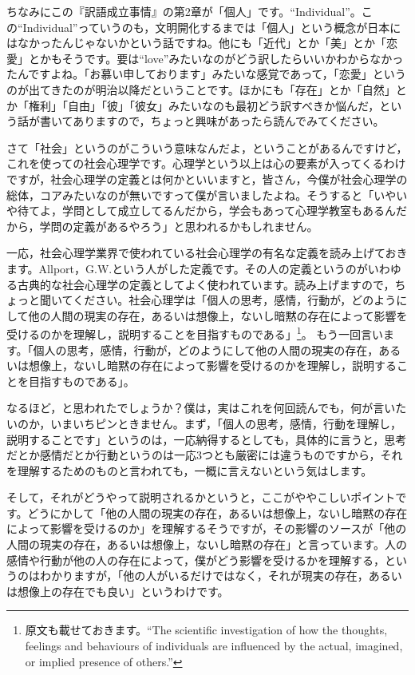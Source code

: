 \documentclass{ltjsbook}
\begin{document}
ちなみにこの『訳語成立事情』の第2章が「個人」です。``Individual''。この``Individual''っていうのも，文明開化するまでは「個人」という概念が日本にはなかったんじゃないかという話ですね。他にも「近代」とか「美」とか「恋愛」とかもそうです。要は``love''みたいなのがどう訳したらいいかわからなかったんですよね。「お慕い申しております」みたいな感覚であって，「恋愛」というのが出てきたのが明治以降だということです。ほかにも「存在」とか「自然」とか「権利」「自由」「彼」「彼女」みたいなのも最初どう訳すべきか悩んだ，という話が書いてありますので，ちょっと興味があったら読んでみてください。

さて「社会」というのがこういう意味なんだよ，ということがあるんですけど，これを使っての社会心理学です。心理学という以上は心の要素が入ってくるわけですが，社会心理学の定義とは何かといいますと，皆さん，今僕が社会心理学の総体，コアみたいなのが無いですって僕が言いましたよね。そうすると「いやいや待てよ，学問として成立してるんだから，学会もあって心理学教室もあるんだから，学問の定義があるやろう」と思われるかもしれません。

一応，社会心理学業界で使われている社会心理学の有名な定義を読み上げておきます。Allport，G.W.という人がした定義\parencite{Allport1954}です。その人の定義というのがいわゆる古典的な社会心理学の定義としてよく使われています。読み上げますので，ちょっと聞いてください。社会心理学は「個人の思考，感情，行動が，どのようにして他の人間の現実の存在，あるいは想像上，ないし暗黙の存在によって影響を受けるのかを理解し，説明することを目指すものである」\footnote{原文も載せておきます。``The scientific investigation of how the thoughts, feelings and behaviours of individuals are influenced by the actual, imagined, or implied presence of others.''\parencite{Allport1954}}。
もう一回言います。「個人の思考，感情，行動が，どのようにして他の人間の現実の存在，あるいは想像上，ないし暗黙の存在によって影響を受けるのかを理解し，説明することを目指すものである」。

なるほど，と思われたでしょうか？僕は，実はこれを何回読んでも，何が言いたいのか，いまいちピンときません。まず，「個人の思考，感情，行動を理解し，説明することです」というのは，一応納得するとしても，具体的に言うと，思考だとか感情だとか行動というのは一応3つとも厳密には違うものですから，それを理解するためのものと言われても，一概に言えないという気はします。

そして，それがどうやって説明されるかというと，ここがややこしいポイントです。どうにかして「他の人間の現実の存在，あるいは想像上，ないし暗黙の存在によって影響を受けるのか」を理解するそうですが，その影響のソースが「他の人間の現実の存在，あるいは想像上，ないし暗黙の存在」と言っています。人の感情や行動が他の人の存在によって，僕がどう影響を受けるかを理解する，というのはわかりますが，「他の人がいるだけではなく，それが現実の存在，あるいは想像上の存在でも良い」というわけです。
\end{document}

